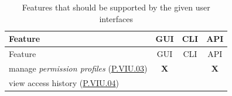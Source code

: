 \documentclass[12pt,english,a4paper,titlepage,cleardoublepage=empty,dottedtoc]{report}
\begin{document}
\begin{longtable}[]{@{}lccc@{}}
\caption{Features that should be supported by the given user interfaces
\label{tbl:ui-features}}\tabularnewline
\toprule
\begin{minipage}[b]{0.36\columnwidth}\raggedright\strut
Feature\strut
\end{minipage} & \begin{minipage}[b]{0.12\columnwidth}\centering\strut
GUI\strut
\end{minipage} & \begin{minipage}[b]{0.12\columnwidth}\centering\strut
CLI\strut
\end{minipage} & \begin{minipage}[b]{0.12\columnwidth}\centering\strut
API\strut
\end{minipage}\tabularnewline
\midrule
\endfirsthead
\toprule
\begin{minipage}[b]{0.36\columnwidth}\raggedright\strut
Feature\strut
\end{minipage} & \begin{minipage}[b]{0.12\columnwidth}\centering\strut
GUI\strut
\end{minipage} & \begin{minipage}[b]{0.12\columnwidth}\centering\strut
CLI\strut
\end{minipage} & \begin{minipage}[b]{0.12\columnwidth}\centering\strut
API\strut
\end{minipage}\tabularnewline
\midrule
\endhead
\begin{minipage}[t]{0.24\columnwidth}\raggedright\strut
manage \emph{permission profiles}
(\protect\hyperlink{pviu03}{P.VIU.03})\strut
\end{minipage} & \begin{minipage}[t]{0.24\columnwidth}\centering\strut
\textbf{X}\strut
\end{minipage} & \begin{minipage}[t]{0.24\columnwidth}\centering\strut
\strut
\end{minipage} & \begin{minipage}[t]{0.24\columnwidth}\centering\strut
\textbf{X}\strut
\end{minipage}\tabularnewline
\begin{minipage}[t]{0.24\columnwidth}\raggedright\strut
view access history (\protect\hyperlink{pviu04}{P.VIU.04})\strut
\end{minipage} & \begin{minipage}[t]{0.24\columnwidth}\centering\strut

\end{minipage}
\end{longtable}
\end{document}

